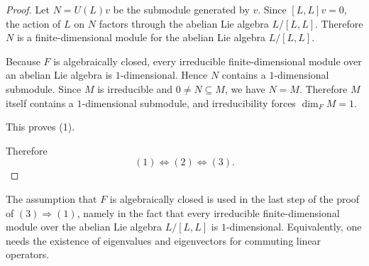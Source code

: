 \begin{proof}
    Let $N=U(L)v$ be the submodule generated by $v$. Since $[L,L]v=0$, the action of $L$ on $N$ factors through the abelian Lie algebra $L/[L,L]$. Therefore $N$ is a finite-dimensional module for the abelian Lie algebra $L/[L,L]$.

    Because $F$ is algebraically closed, every irreducible finite-dimensional module over an abelian Lie algebra is $1$-dimensional. Hence $N$ contains a $1$-dimensional submodule. Since $M$ is irreducible and $0\neq N\subseteq M$, we have $N=M$. Therefore $M$ itself contains a $1$-dimensional submodule, and irreducibility forces $\dim_F M=1$.

    This proves (1).

    \smallskip

    Therefore
    \[
        (1)\Longleftrightarrow(2)\Longleftrightarrow(3).
    \]
\end{proof}

\begin{remark}
    The assumption that $F$ is algebraically closed is used in the last step of the proof of $(3)\Rightarrow(1)$, namely in the fact that every irreducible finite-dimensional module over the abelian Lie algebra $L/[L,L]$ is $1$-dimensional. Equivalently, one needs the existence of eigenvalues and eigenvectors for commuting linear operators.
\end{remark}

